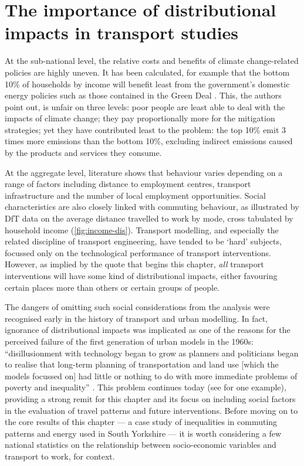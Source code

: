 \documentclass[a4paper, 11pt, twoside]{Thesis}
\begin{document}
\section{The importance of distributional impacts in transport studies}
At the sub-national level, the relative costs and benefits of climate change-related
policies are highly uneven. It has been calculated, for example that the bottom
10\% of households by income will benefit least from the government's domestic
energy policies such as those contained in the Green Deal \citep{JRF2013-distributions}.
This, the authors point out, is unfair on three levels: poor people are least
able to deal with the impacts of climate change; they pay proportionally more for the
mitigation strategies; yet they have contributed least to the problem: the top
10\% emit 3 times more emissions than the bottom 10\%, excluding indirect emissions
caused by the products and services they consume.

At the aggregate level, literature shows that behaviour varies depending
on a range of factors including distance to employment
centres,
transport infrastructure and the number of local employment opportunities.
Social characteristics are also closely linked with commuting behaviour,
as illustrated by DfT data on the average distance travelled to work
by mode, cross tabulated by household income (\cref{fig:income-dis}). Transport
modelling, and especially the related discipline of transport engineering, have
tended to be `hard' subjects, focussed only on the technological performance of
transport interventions. However, as implied by the quote that begins this
chapter, \emph{all} transport interventions will have some kind of
distributional impacts, either favouring certain places more than others or
certain groups of people.

The dangers of omitting such social considerations from the analysis were
recognised early in the history of transport and urban modelling. In fact,
ignorance of distributional impacts was implicated as
one of the reasons for the perceived failure of the first generation of urban
models in the 1960s: ``disillusionment with technology began to grow as
planners and politicians began to realise that long-term planning of
transportation and land use [which the models focussed on] had little or nothing
to do with more immediate problems of poverty and inequality''
\citep[p~10]{batty1976urban}. This problem continues today (see
\citealp{Tribby2012} for one example), providing a strong remit for this
chapter and its focus on including social factors in the evaluation of travel
patterns and future interventions. Before moving on to the core results of this
chapter --- a case study of inequalities in commuting patterns and energy used
in South Yorkshire --- it is worth considering a few national statistics on
the relationship between socio-economic variables and transport to work, for
context.
\end{document}
